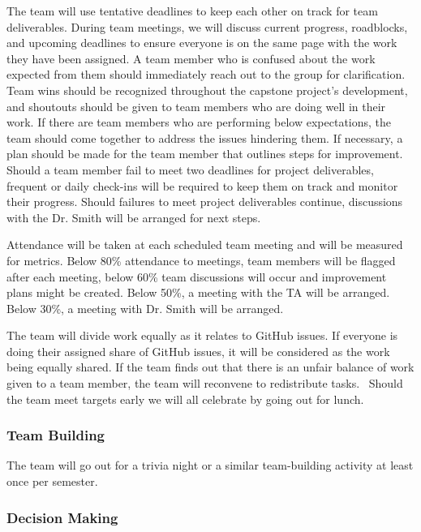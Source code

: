\documentclass{article}
\begin{document}
The team will use tentative deadlines to keep each other on track for team deliverables. During team meetings, we will discuss current progress, roadblocks, and upcoming deadlines to ensure everyone is on the same page with the work they have been assigned. A team member who is confused about the work expected from them should immediately reach out to the group for clarification. Team wins should be recognized throughout the capstone project's development, and shoutouts should be given to team members who are doing well in their work. If there are team members who are performing below expectations, the team should come together to address the issues hindering them. If necessary, a plan should be made for the team member that outlines steps for improvement. Should a team member fail to meet two deadlines for project deliverables, frequent or daily check-ins will be required to keep them on track and monitor their progress. Should failures to meet project deliverables continue, discussions with the Dr. Smith will be arranged for next steps. 
 
Attendance will be taken at each scheduled team meeting and will be measured for metrics. Below 80\% attendance to meetings, team members will be flagged after each meeting, below 60\% team discussions will occur and improvement plans might be created. Below 50\%, a meeting with the TA will be arranged. Below 30\%, a meeting with Dr. Smith will be arranged. 
 
The team will divide work equally as it relates to GitHub issues. If everyone is doing their assigned share of GitHub issues, it will be considered as the work being equally shared. If the team finds out that there is an unfair balance of work given to a team member, the team will reconvene to redistribute tasks.  
\
Should the team meet targets early we will all celebrate by going out for lunch. 

\subsubsection*{Team Building}

The team will go out for a trivia night or a similar team-building activity at least once per semester.

\subsubsection*{Decision Making} 
\end{document}
